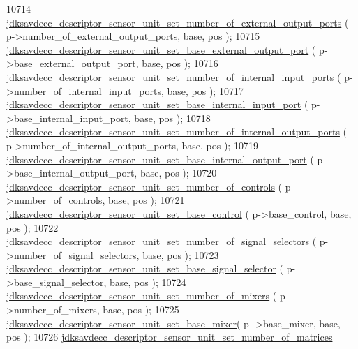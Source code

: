 \begin{DoxyCode}
10714         \hyperlink{group__descriptor__sensor_ga8038d96df60271119005c2e1a38cd0bf}{jdksavdecc\_descriptor\_sensor\_unit\_set\_number\_of\_external\_output\_ports}
      ( p->number\_of\_external\_output\_ports, base, pos );
10715         \hyperlink{group__descriptor__sensor_ga2d015e0ff97fbebb52b21f8fc12a020b}{jdksavdecc\_descriptor\_sensor\_unit\_set\_base\_external\_output\_port}
      ( p->base\_external\_output\_port, base, pos );
10716         \hyperlink{group__descriptor__sensor_gad50e2fe7e7d62e84983e02acc00b8b9d}{jdksavdecc\_descriptor\_sensor\_unit\_set\_number\_of\_internal\_input\_ports}
      ( p->number\_of\_internal\_input\_ports, base, pos );
10717         \hyperlink{group__descriptor__sensor_gaa690164aa3f909046fc090cfb50da99f}{jdksavdecc\_descriptor\_sensor\_unit\_set\_base\_internal\_input\_port}
      ( p->base\_internal\_input\_port, base, pos );
10718         \hyperlink{group__descriptor__sensor_gaa4cb939335d258b621cf8b48a3627c3b}{jdksavdecc\_descriptor\_sensor\_unit\_set\_number\_of\_internal\_output\_ports}
      ( p->number\_of\_internal\_output\_ports, base, pos );
10719         \hyperlink{group__descriptor__sensor_gaa18f18db4acd31f6964e6e113257e1d7}{jdksavdecc\_descriptor\_sensor\_unit\_set\_base\_internal\_output\_port}
      ( p->base\_internal\_output\_port, base, pos );
10720         \hyperlink{group__descriptor__sensor_ga7119d8f25637338070dccabad4b4989f}{jdksavdecc\_descriptor\_sensor\_unit\_set\_number\_of\_controls}
      ( p->number\_of\_controls, base, pos );
10721         \hyperlink{group__descriptor__sensor_ga183a282a0632836e47ff56d5c7ce131e}{jdksavdecc\_descriptor\_sensor\_unit\_set\_base\_control}
      ( p->base\_control, base, pos );
10722         \hyperlink{group__descriptor__sensor_ga2e7f35ccf1d91730cc95a889610285dd}{jdksavdecc\_descriptor\_sensor\_unit\_set\_number\_of\_signal\_selectors}
      ( p->number\_of\_signal\_selectors, base, pos );
10723         \hyperlink{group__descriptor__sensor_ga54e4ff061b40ed84e483ff3c6a819520}{jdksavdecc\_descriptor\_sensor\_unit\_set\_base\_signal\_selector}
      ( p->base\_signal\_selector, base, pos );
10724         \hyperlink{group__descriptor__sensor_ga18510efbd3546271101aac8aea7a4680}{jdksavdecc\_descriptor\_sensor\_unit\_set\_number\_of\_mixers}
      ( p->number\_of\_mixers, base, pos );
10725         \hyperlink{group__descriptor__sensor_gacfb5a61e84ae4ea32029d71457091c72}{jdksavdecc\_descriptor\_sensor\_unit\_set\_base\_mixer}( p
      ->base\_mixer, base, pos );
10726         \hyperlink{group__descriptor__sensor_ga82fcad1e4709ea82d9f3ac5ec7e653c0}{jdksavdecc\_descriptor\_sensor\_unit\_set\_number\_of\_matrices}

\end{DoxyCode}
